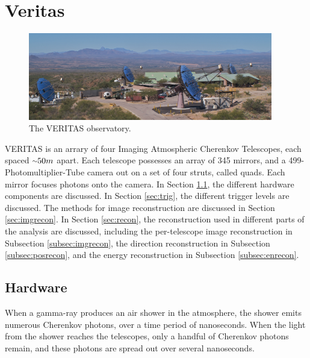\cleartooddpage[\thispagestyle{empty}]
\chapter{Veritas}

\begin{figure}[h]
  \begin{center}
    \includegraphics[width=0.95\textwidth]{images/veritas_array_v6}
    \caption[VERITAS Array]{The VERITAS observatory.}\label{fig:veritasarray}
  \end{center}
\end{figure}

VERITAS is an arrary of four Imaging Atmospheric Cherenkov Telescopes, each spaced $\nicetilde50m$ apart.
Each telescope possesses an array of 345 mirrors, and a 499-Photomultiplier-Tube camera out on a set of four struts, called quads.
Each mirror focuses photons onto the camera.
In Section \ref{sec:hardware}, the different hardware components are discussed.
In Section \ref{sec:trig}, the different trigger levels are discussed.
The methods for image reconstruction are discussed in Section \ref{sec:imgrecon}.
In Section \ref{sec:recon}, the reconstruction used in different parts of the analysis are discussed, including the per-telescope image reconstruction in Subsection \ref{subsec:imgrecon}, the direction reconstruction in Subsection \ref{subsec:posrecon}, and the energy reconstruction in Subsection \ref{subsec:enrecon}.


\section{Hardware}\label{sec:hardware}
When a gamma-ray produces an air shower in the atmosphere, the shower emits numerous Cherenkov photons, over a time period of nanoseconds.
When the light from the shower reaches the telescopes, only a handful of Cherenkov photons remain, and these photons are spread out over several nanoseconds.

